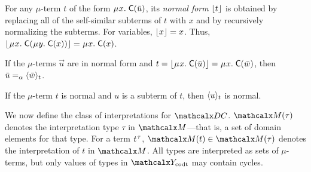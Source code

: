 For any $\mu$-term $t$ of the form $\MU x.\; \const C( \vec u )$,
its \emph{normal form} $\nf{t}$ is obtained
by replacing all of the self-similar subterms of $t$ with $x$
and by recursively normalizing the subterms.
For variables, $\nf{x} = x$.
Thus, $\nf{\MU x.\; \const{C}( \MU y.\; \const{C}( x ) )} = \MU x.\; \const{C}( x )$.

\begin{rep}
\begin{lemma}
\label{lem:mu-norm-arg}
If the $\mu$-terms $\vec u$ are in normal form and $t = \nf{\MU x.\; \const{C}( \vec u )} = \MU x.\; \const{C}( \vec w )$,
then $\vec u \vsim \interp{t}{\vec w}$\vthinspace.
\end{lemma}

\begin{lemma}
\label{lem:mu-norm-interp}
If the $\mu$-term $t$ is normal and $u$ is a subterm of $t$, then $\interp{t}{u}$ is normal.
\end{lemma}

\end{rep}

We now define the class of interpretations for $\thD$.
$\M( \tau )$ denotes the interpretation type $\tau$ in $\M$---that is, a set of
domain elements for that type.
For a term $t\typ{\tau}$, $\M( t ) \in \M( \tau )$ denotes the interpretation of $t$ in $\M$.
All types are interpreted as sets of $\mu$-terms, but
only values of types in $\Codata$ may contain cycles.

